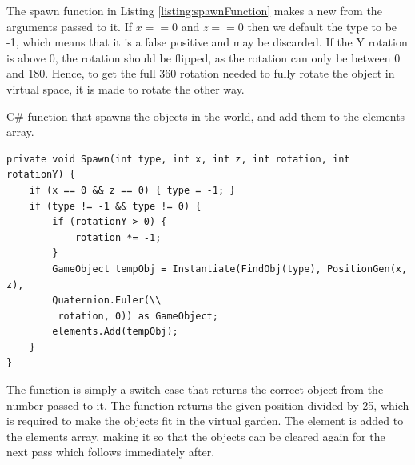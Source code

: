 The spawn function in Listing \ref{listing:spawnFunction} makes a new  from the arguments passed to it. If $x == 0$ and $z == 0$ then we default the type to be -1, which means that it is a false positive and may be discarded. If the Y rotation is above 0, the rotation should be flipped, as the rotation can only be between 0 and 180. Hence, to get the full 360 rotation needed to fully rotate the object in virtual space, it is made to rotate the other way.
\begin{listing}[H]
	\caption{C\# function that spawns the objects in the world, and add them to the elements array.}
	\begin{verbatim}
private void Spawn(int type, int x, int z, int rotation, int rotationY) {
	if (x == 0 && z == 0) { type = -1; }
	if (type != -1 && type != 0) {
		if (rotationY > 0) {
			rotation *= -1;
		}
		GameObject tempObj = Instantiate(FindObj(type), PositionGen(x, z),
		Quaternion.Euler(\\
		 rotation, 0)) as GameObject;
		elements.Add(tempObj);
	}
}
	\end{verbatim}
\label{listing:spawnFunction}
\end{listing}
The  function is simply a switch case that returns the correct object from the number passed to it. The  function returns the given position divided by 25, which is required to make the objects fit in the virtual garden. The element is added to the elements array, making it so that the objects can be cleared again for the next pass which follows immediately after.

